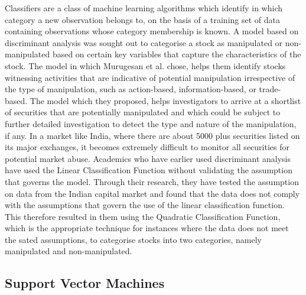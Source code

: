 Classifiers are a class of machine learning algorithms which identify in which category a new observation belongs to, on the basis of a training set of data containing observations whose category membership is known. A model based on discriminant analysis was sought out to categorise a stock as manipulated or non-manipulated based on certain key variables that capture the characteristics of the stock.\cite{Murugesan:2012aa} The model in which Murugesan et al. chose, helps them identify stocks witnessing activities that are indicative of potential manipulation irrespective of the type of manipulation, such as action-based, information-based, or trade-based. The model which they proposed, helps investigators to arrive at a shortlist of securities that are potentially manipulated and which could be subject to further detailed investigation to detect the type and nature of the manipulation, if any. In a market like India, where there are about 5000 plus securities listed on its major exchanges, it becomes extremely difficult to monitor all securities for potential market abuse. Academics who have earlier used discriminant analysis have used the Linear Classification Function without validating the assumption that governs the model. Through their research, they have tested the assumption on data from the Indian capital market and found that the data does not comply with the assumptions that govern the use of the linear classification function. This therefore resulted in them using the Quadratic Classification Function, which is the appropriate technique for instances where the data does not meet the sated assumptions, to categorise stocks into two categories, namely manipulated and non-manipulated.

\subsection{Support Vector Machines}

